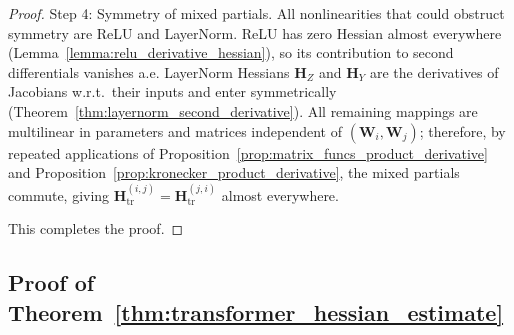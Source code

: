 \documentclass{article}
\begin{document}
\begin{proof}
Step 4: Symmetry of mixed partials.
All nonlinearities that could obstruct symmetry are ReLU and LayerNorm. ReLU has zero Hessian almost everywhere (Lemma~\ref{lemma:relu_derivative_hessian}), so its contribution to second differentials vanishes a.e. LayerNorm Hessians $\mathbf{H}_Z$ and $\mathbf{H}_Y$ are the derivatives of Jacobians w.r.t.\ their inputs and enter symmetrically (Theorem~\ref{thm:layernorm_second_derivative}). All remaining mappings are multilinear in parameters and matrices independent of $(\mathbf{W}_i,\mathbf{W}_j)$; therefore, by repeated applications of Proposition~\ref{prop:matrix_funcs_product_derivative} and Proposition~\ref{prop:kronecker_product_derivative}, the mixed partials commute, giving $\mathbf{H}_{\mathrm{tr}}^{(i,j)}=\mathbf{H}_{\mathrm{tr}}^{(j,i)}$ almost everywhere.

This completes the proof.
\end{proof}

\subsection{Proof of Theorem~\ref{thm:transformer_hessian_estimate}}\label{app:proof_transformer_hessian_estimate}
\end{document}
